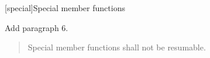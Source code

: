 
\setcounter{chapter}{11}
[special]{Special member functions}

Add paragraph 6.

\begin{quote}
	\setcounter{Paras}{5}
	\pnum
	Special member functions shall not be resumable.
\end{quote}
